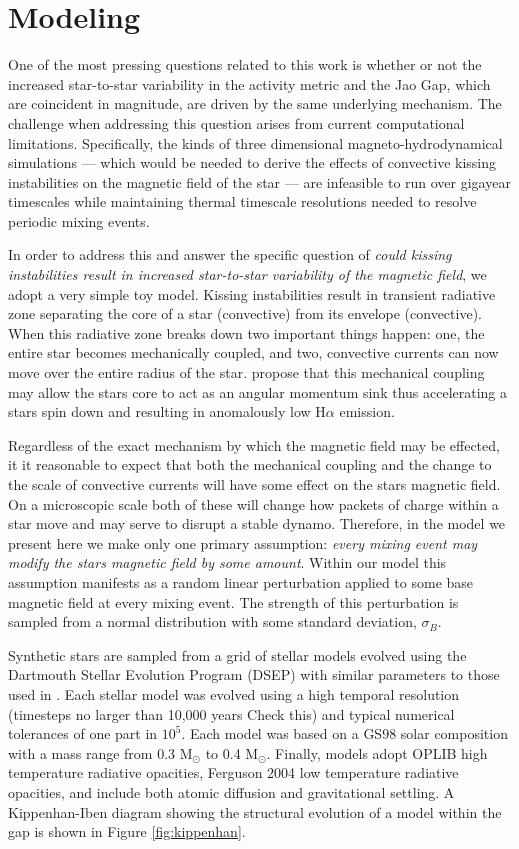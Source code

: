 \section{Modeling}\label{sec:modeling}
One of the most pressing questions related to this work is whether or not the
increased star-to-star variability in the activity metric and the Jao Gap,
which are coincident in magnitude, are driven by the same underlying mechanism.
The challenge when addressing this question arises from current computational
limitations. Specifically, the kinds of three dimensional
magneto-hydrodynamical simulations --- which would be needed to derive the
effects of convective kissing instabilities on the magnetic field of the star
--- are infeasible to run over gigayear timescales while maintaining thermal
timescale resolutions needed to resolve periodic mixing events.

In order to address this and answer the specific question of \textit{could
kissing instabilities result in increased star-to-star variability of the
magnetic field}, we adopt a very simple toy model. Kissing instabilities result
in transient radiative zone separating the core of a star (convective) from its
envelope (convective). When this radiative zone breaks down two important
things happen: one, the entire star becomes mechanically coupled, and two,
convective currents can now move over the entire radius of the star.
\citet{Jao2023} propose that this mechanical coupling may allow the stars core
to act as an angular momentum sink thus accelerating a stars spin down and
resulting in anomalously low H$\alpha$ emission. 

Regardless of the exact mechanism by which the magnetic field may be effected,
it it reasonable to expect that both the mechanical coupling and the change to
the scale of convective currents will have some effect on the stars magnetic
field. On a microscopic scale both of these will change how packets of charge
within a star move and may serve to disrupt a stable dynamo. Therefore, in the
model we present here we make only one primary assumption: \textit{every mixing
event may modify the stars magnetic field by some amount}. Within our model
this assumption manifests as a random linear perturbation applied to some base
magnetic field at every mixing event. The strength of this perturbation is 
sampled from a normal distribution with some standard deviation, $\sigma_{B}$.

Synthetic stars are sampled from a grid of stellar models evolved using the
Dartmouth Stellar Evolution Program (DSEP) with similar parameters to those
used in \citet{Boudreaux2023}. Each stellar model was evolved using a high
temporal resolution (timesteps no larger than 10,000 years {\color{red} Check
this}) and typical numerical tolerances of one part in $10^5$. Each model was
based on a GS98 \citep{Grevesse1998} solar composition with a mass range from
0.3 M$_{\odot}$ to 0.4 M$_{\odot}$. Finally, models adopt OPLIB high
temperature radiative opacities, Ferguson 2004 low temperature radiative
opacities, and include both atomic diffusion and gravitational settling. A
Kippenhan-Iben diagram showing the structural evolution of a model within the
gap is shown in Figure \ref{fig:kippenhan}.

